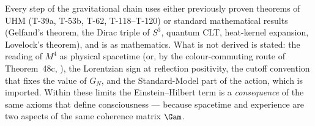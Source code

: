 Every step of the gravitational chain uses either previously proven theorems of UHM (T-39a,
T-53b, T-62, T-118--T-120) or standard mathematical results (Gelfand's theorem, the Dirac
triple of $S^3$, quantum CLT, heat-kernel expansion, Lovelock's theorem), and is
 as mathematics. What is not derived is stated: the reading of $M^4$ as physical
spacetime  (or, by the colour-commuting route of Theorem~48c, ),
the Lorentzian sign at reflection positivity, the cutoff convention that fixes the value of
$G_N$, and the Standard-Model part of the action, which is imported. Within these limits the
Einstein--Hilbert term is a \emph{consequence} of the same axioms that define consciousness
--- because spacetime and experience are two aspects of the same coherence matrix $\Gam$.
